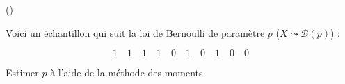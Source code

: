 \begin{exercice}\label{exo5-2} (\minsyndical)

Voici un \'echantillon qui suit la loi de Bernoulli de param\`etre $p$ ($X \leadsto \mathcal{B}(p)$) :

\[
1\quad1\quad1\quad1\quad0\quad1\quad0\quad1\quad0\quad0
\]

Estimer $p$ \`a l'aide de la m\'ethode des moments.\\


\end{exercice}
